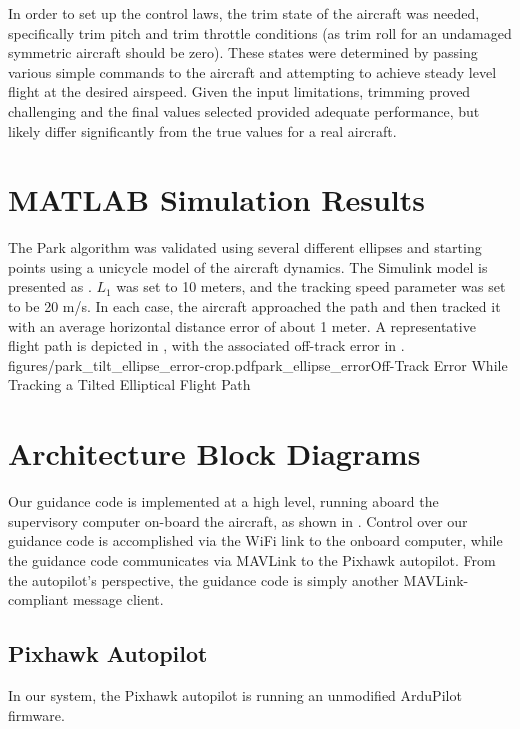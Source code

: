\documentclass{aiaa}
\begin{document}
In order to set up the control laws, the trim state of the aircraft was needed, specifically trim pitch and trim throttle conditions (as trim roll for an undamaged symmetric aircraft should be zero). These states were determined by passing various simple commands to the aircraft and attempting to achieve steady level flight at the desired airspeed. Given the input limitations, trimming proved challenging and the final values selected provided adequate performance, but likely differ significantly from the true values for a real aircraft.

\section{MATLAB Simulation Results}
The Park algorithm was validated using several different ellipses and starting points using a unicycle model of the aircraft dynamics. The Simulink model is presented as . $L_1$ was set to 10 meters, and the tracking speed parameter was set to be 20 m/s.  In each case, the aircraft approached the path and then tracked it with an average horizontal distance error of about 1 meter. A representative flight path is depicted in , with the associated off-track error in .
{figures/park_tilt_ellipse_error-crop.pdf}{park_ellipse_error}{Off-Track Error While Tracking a Tilted Elliptical Flight Path}
\section{Architecture Block Diagrams}
Our guidance code is implemented at a high level, running aboard the supervisory computer on-board the aircraft, as shown in . Control over our guidance code is accomplished via the WiFi link to the onboard computer, while the guidance code communicates via MAVLink to the Pixhawk autopilot. From the autopilot's perspective, the guidance code is simply another MAVLink-compliant message client. 
\subsection{Pixhawk Autopilot}
In our system, the Pixhawk autopilot is running an unmodified ArduPilot firmware.
\end{document}

